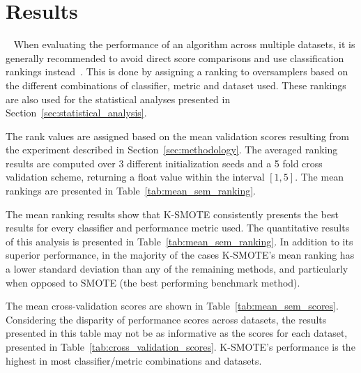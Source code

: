 \documentclass[parskip=full]{scrartcl}
\begin{document}
\section{Results}~\label{sec:results}
When evaluating the performance of an algorithm across multiple datasets, it is
generally recommended to avoid direct score comparisons and use classification
rankings instead~\cite{demvsar2006}. This is done by assigning a ranking to
oversamplers based on the different combinations of classifier, metric and
dataset used. These rankings are also used for the statistical analyses
presented in Section~\ref{sec:statistical_analysis}.

The rank values are assigned based on the mean validation scores resulting from
the experiment described in Section~\ref{sec:methodology}. The averaged ranking
results are computed over 3 different initialization seeds and a 5 fold cross
validation scheme, returning a float value within the interval $[1,5]$. The mean
rankings are presented in Table~\ref{tab:mean_sem_ranking}.

The mean ranking results show that K-SMOTE consistently presents the best
results for every classifier and performance metric used. The quantitative
results of this analysis is presented in Table~\ref{tab:mean_sem_ranking}. In
addition to its superior performance, in the majority of the cases K-SMOTE's
mean ranking has a lower standard deviation than any of the remaining methods,
and particularly when opposed to SMOTE (the best performing benchmark method).


The mean cross-validation scores are shown in Table~\ref{tab:mean_sem_scores}.
Considering the disparity of performance scores across datasets, the results
presented in this table may not be as informative as the scores for each
dataset, presented in Table~\ref{tab:cross_validation_scores}. K-SMOTE's
performance is the highest in most classifier/metric combinations and
datasets.

\end{document}
